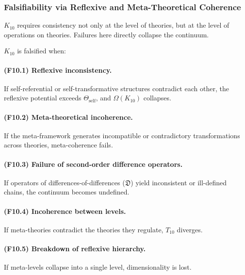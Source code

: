 \subsubsection{Falsifiability via Reflexive and Meta-Theoretical Coherence}

$K_{10}$ requires consistency not only at the level of theories, but at the
level of operations on theories. Failures here directly collapse the continuum.

$K_{10}$ is falsified when:

\paragraph{(F10.1) Reflexive inconsistency.}
If self-referential or self-transformative structures
contradict each other, the reflexive potential exceeds
$\Theta_{\mathrm{self}}$, and $\Omega(K_{10})$ collapses.

\paragraph{(F10.2) Meta-theoretical incoherence.}
If the meta-framework generates incompatible or contradictory
transformations across theories, meta-coherence fails.

\paragraph{(F10.3) Failure of second-order difference operators.}
If operators of differences-of-differences ($\mathfrak{D}$)
yield inconsistent or ill-defined chains, 
the continuum becomes undefined.

\paragraph{(F10.4) Incoherence between levels.}
If meta-theories contradict the theories they regulate,
$T_{10}$ diverges.

\paragraph{(F10.5) Breakdown of reflexive hierarchy.}
If meta-levels collapse into a single level, 
dimensionality is lost.



